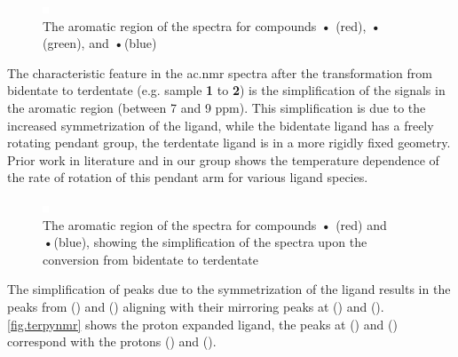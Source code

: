 \begin{figure}[!htbp]
 \begin{center}
  \includegraphics[clip=true]{images/insertgraphic.eps}
 \end{center}
\caption[The aromatic region of the \texorpdfstring{}{1H}  spectra of 3 bidentate compounds]{The aromatic region of the \texorpdfstring{}{1H}  spectra for compounds \textbf{•} (red), \textbf{•} (green), and \textbf{•}(blue)}
\label{fig.bid3nmr}
\end{figure} 

The characteristic feature in the \gls{ac.nmr} spectra after the transformation from bidentate to terdentate (e.g. sample \textbf{1} to \textbf{2}) is the simplification of the signals in the aromatic region (between 7 and 9 ppm). This simplification is due to the increased symmetrization of the ligand, while the  bidentate ligand has a freely rotating pendant group, the  terdentate ligand is in a more rigidly fixed geometry. Prior work in literature and in our group\autocite{jurca2012} shows the temperature dependence of the rate of rotation of this pendant arm for various ligand species. 

\begin{figure}[!htbp]
 \begin{center}
  \includegraphics[clip=true]{images/insertgraphic.eps}
 \end{center}
\caption[The aromatic region of the \texorpdfstring{}{1H}  spectra showing bidentate - terdentate conversion]{The aromatic region of the \texorpdfstring{}{1H}  spectra for compounds \textbf{•} (red) and \textbf{•}(blue), showing the simplification of the spectra upon the conversion from bidentate to terdentate}
\label{fig.bidtoter}
\end{figure} 

The simplification of peaks due to the symmetrization of the ligand results in the peaks from () and () aligning with their mirroring peaks at () and (). \autoref{fig.terpynmr} shows the proton expanded ligand, the peaks at () and () correspond with the protons () and (). 

